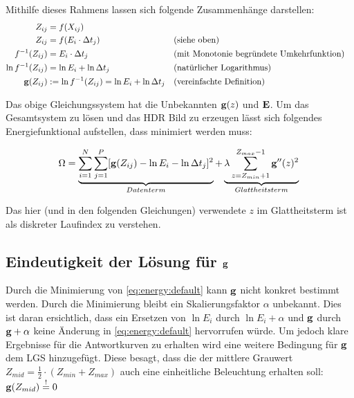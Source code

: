 Mithilfe dieses Rahmens lassen sich folgende Zusammenhänge darstellen:
\begin{align*}
Z_{ij} &= f(X_{ij})\\
Z_{ij} &=f(E_i \cdot \Delta t_j)&&\text{(siehe oben)}\\
f^{-1}(Z_{ij}) &= E_i \cdot \Delta t_j & &\text{(mit Monotonie begründete Umkehrfunktion)}\\
\ln f^{-1}(Z_{ij}) &= \ln E_i + \ln \Delta t_j&&\text{(natürlicher Logarithmus)}\\
\mathbf g(Z_{ij}) &:= \ln f^{-1}(Z_{ij}) = \ln E_i + \ln \Delta t_j && \text{(vereinfachte Definition)}\\
\end{align*}

Das obige Gleichungssystem hat die Unbekannten $\mathbf g(z)$ und $\mathbf E$. Um das Gesamtsystem zu lösen und das \gls{HDR} Bild zu erzeugen lässt sich folgendes Energiefunktional aufstellen, dass minimiert werden muss:

\begin{equation}
\label{eq:energy:default}
\Omega = \underbrace{\sum \limits_{i=1}^{N} \sum \limits_{j=1}^{P}[\mathbf g(Z_{ij}) - \ln E_i - \ln \Delta t_j]^2}_{Datenterm} + \underbrace{\lambda  \sum \limits_{z=Z_{min}+1}^{Z_{max}-1} \mathbf{g}''(z)^2}_{Glattheitsterm}\\
\end{equation}

Das hier (und in den folgenden Gleichungen) verwendete $z$ im Glattheitsterm ist als diskreter Laufindex zu verstehen. 

\subsection{Eindeutigkeit der Lösung für $\mathbf g$}
\label{sec:eindeutigkeit}
Durch die Minimierung von \autoref{eq:energy:default} kann $\mathbf g$ nicht konkret bestimmt werden. Durch die Minimierung bleibt ein Skalierungsfaktor $\alpha$ unbekannt. Dies ist daran ersichtlich, dass ein Ersetzen von $\ln E_i$ durch $\ln E_i + \alpha$ und $\mathbf g$ durch $\mathbf g + \alpha$ keine Änderung in \autoref{eq:energy:default} hervorrufen würde. Um jedoch klare Ergebnisse für die Antwortkurven zu erhalten wird eine weitere Bedingung für $\mathbf g$ dem \gls{LGS} hinzugefügt. Diese besagt, dass die der mittlere Grauwert $Z_{mid} = \frac{1}{2}\cdot(Z_{min}+Z_{max})$ auch eine einheitliche Beleuchtung erhalten soll: $\mathbf g(Z_{mid}) \overset{!}{=} 0$

